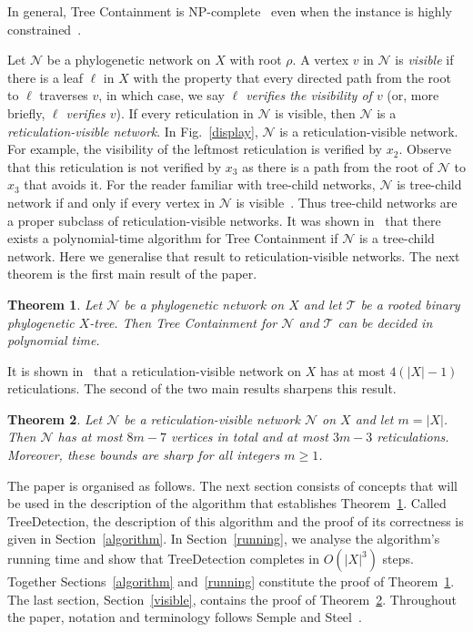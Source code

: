 \documentclass[11pt]{amsart}
\newtheorem{theorem}{Theorem}[section]
\begin{document}
\noindent In general, {\sc Tree Containment} is NP-complete~\cite{kan08} even when the instance is highly constrained~\cite{ier10}.

Let ${{\mathcal N}}$ be a phylogenetic network on $X$ with root $\rho$. A vertex $v$ in ${{\mathcal N}}$ is {\em visible} if there is a leaf $\ell$ in $X$ with the property that every directed path from the root to $\ell$ traverses $v$, in which case, we say {\em $\ell$ verifies the visibility of $v$} (or, more briefly, {\em $\ell$ verifies $v$}). If every reticulation in ${{\mathcal N}}$ is visible, then ${{\mathcal N}}$ is a {\em reticulation-visible network}. In Fig.~\ref{display}, ${{\mathcal N}}$ is a reticulation-visible network. For example, the visibility of the leftmost reticulation is verified by $x_2$. Observe that this reticulation is not verified by $x_3$ as there is a path from the root of ${{\mathcal N}}$ to $x_3$ that avoids it. For the reader familiar with tree-child networks, ${{\mathcal N}}$ is tree-child network if and only if every vertex in ${{\mathcal N}}$ is visible~\cite[Lemma~2]{car09}. Thus tree-child networks are a proper subclass of reticulation-visible networks. It was shown in~\cite{ier10} that there exists a polynomial-time algorithm for {\sc Tree Containment} if ${{\mathcal N}}$ is a tree-child network. Here we generalise that result to reticulation-visible networks. The next theorem is the first main result of the paper.

\begin{theorem}
Let ${{\mathcal N}}$ be a phylogenetic network on $X$ and let ${{\mathcal T}}$ be a rooted binary phylogenetic $X$-tree. Then {\sc Tree Containment} for ${{\mathcal N}}$ and ${{\mathcal T}}$ can be decided in polynomial time.
\label{decision}
\end{theorem}

It is shown in~\cite{gam15} that a reticulation-visible network on $X$ has at most $4(|X|-1)$ reticulations. The second of the two main results sharpens this result.

\begin{theorem}
Let ${{\mathcal N}}$ be a reticulation-visible network ${{\mathcal N}}$ on $X$ and let $m=|X|$. Then ${{\mathcal N}}$ has at most $8m-7$ vertices in total and at most $3m-3$ reticulations. Moreover, these bounds are sharp for all integers $m\ge 1$.
\label{sharp}
\end{theorem}

The paper is organised as follows. The next section consists of concepts that will be used in the description of the algorithm that establishes Theorem~\ref{decision}. Called {\sc TreeDetection}, the description of this algorithm and the proof of its correctness is given in Section~\ref{algorithm}. In Section~\ref{running}, we analyse the algorithm's running time and show that {\sc TreeDetection} completes in $O(|X|^3)$ steps. Together Sections~\ref{algorithm} and~\ref{running} constitute the proof of Theorem~\ref{decision}. The last section, Section~\ref{visible}, contains the proof of Theorem~\ref{sharp}. Throughout the paper, notation and terminology follows Semple and Steel~\cite{sem03}.
\end{document}
